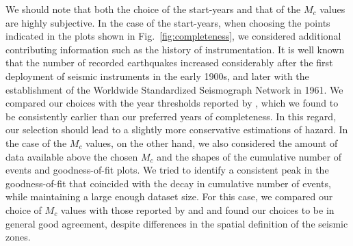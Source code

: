 We should note that both the choice of the start-years and that of the $M_c$ values are highly subjective. In the case of the start-years, when choosing the points indicated in the plots shown in Fig.~\ref{fig:completeness}, we considered additional contributing information such as the history of instrumentation. It is well known that the number of recorded earthquakes increased considerably after the first deployment of seismic instruments in the early 1900s, and later with the establishment of the Worldwide Standardized Seismograph Network in 1961. We compared our choices with the year thresholds reported by \citet{Zare2014}, which we found to be consistently earlier than our preferred years of completeness. In this regard, our selection should lead to a slightly more conservative estimations of hazard. In the case of the $M_c$ values, on the other hand, we also considered the amount of data available above the chosen $M_c$ and the shapes of the cumulative number of events and goodness-of-fit plots. We tried to identify a consistent peak in the goodness-of-fit that coincided with the decay in cumulative number of events, while maintaining a large enough dataset size. For this case, we compared our choice of $M_c$ values with those reported by \citet{Karimiparidari2013} and \citet{Khodaverdian_2016_BSSA} and found our choices to be in general good agreement, despite differences in the spatial definition of the seismic zones.

